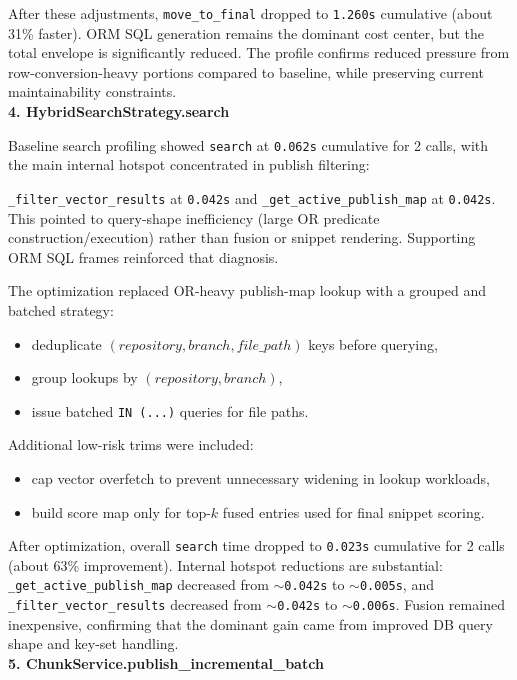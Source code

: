 \documentclass[a4paper,12pt]{article}
\begin{document}
After these adjustments, \texttt{move\_to\_final} dropped to \texttt{1.260s} cumulative (about 31\% faster). ORM SQL generation remains the dominant cost center, but the total envelope is significantly reduced. The profile confirms reduced pressure from row-conversion-heavy portions compared to baseline, while preserving current maintainability constraints. \\

\textbf{4. HybridSearchStrategy.search}

Baseline search profiling showed \texttt{search} at \texttt{0.062s} cumulative for 2 calls, with the main internal hotspot concentrated in publish filtering:

\texttt{\_filter\_vector\_results} at \texttt{0.042s} and \texttt{\_get\_active\_publish\_map} at \texttt{0.042s}.  
This pointed to query-shape inefficiency (large OR predicate construction/execution) rather than fusion or snippet rendering. Supporting ORM SQL frames reinforced that diagnosis.

The optimization replaced OR-heavy publish-map lookup with a grouped and batched strategy:
\begin{itemize}
\item deduplicate \((repository, branch, file\_path)\) keys before querying,
\item group lookups by \((repository, branch)\),
\item issue batched \texttt{IN (...)} queries for file paths.
\end{itemize}
Additional low-risk trims were included:
\begin{itemize}
\item cap vector overfetch to prevent unnecessary widening in lookup workloads,
\item build score map only for top-\(k\) fused entries used for final snippet scoring.
\end{itemize}

After optimization, overall \texttt{search} time dropped to \texttt{0.023s} cumulative for 2 calls (about 63\% improvement). Internal hotspot reductions are substantial: \texttt{\_get\_active\_publish\_map} decreased from \(\sim\)\texttt{0.042s} to \(\sim\)\texttt{0.005s}, and \texttt{\_filter\_vector\_results} decreased from \(\sim\)\texttt{0.042s} to \(\sim\)\texttt{0.006s}. Fusion remained inexpensive, confirming that the dominant gain came from improved DB query shape and key-set handling. \\

\textbf{5. ChunkService.publish\_incremental\_batch}
\end{document}
